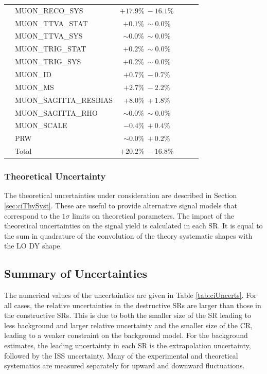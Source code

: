 {\begin{table}[]
\begin{center}
\begin{tabular}{c l c c c c}
& MUON\_RECO\_SYS & $+ 17.9\% \   -16.1\%$ \\
& MUON\_TTVA\_STAT & $+ 0.1\% \ \sim 0.0\%$ \\
& MUON\_TTVA\_SYS & $\sim 0.0\% \ \sim 0.0\%$ \\
& MUON\_TRIG\_STAT & $+ 0.2\% \ \sim 0.0\%$ \\
& MUON\_TRIG\_SYS & $+ 0.2\% \ \sim 0.0\%$ \\
& MUON\_ID & $+ 0.7\% \   -0.7\%$ \\
& MUON\_MS & $+ 2.7\% \   -2.2\%$ \\
& MUON\_SAGITTA\_RESBIAS & $+ 8.0\% \ + 1.8\%$ \\
& MUON\_SAGITTA\_RHO & $\sim 0.0\% \ \sim 0.0\%$ \\
& MUON\_SCALE & $  -0.4\% \ + 0.4\%$ \\
& PRW & $\sim 0.0\% \ + 0.2\%$ \\
& Total & $+ 20.2\% \   -16.8\%$ \\
\bottomrule
\end{tabular}
\label{tab:ciExpVariationBonanzaMm}
\end{center}
\end{table}
\clearpage
}

\subsubsection{Theoretical Uncertainty}\label{sec:ciSigThySyst}
The theoretical uncertainties under consideration are described in Section \ref{sec:ciThySyst}.
These are useful to provide alternative signal models that correspond to the $1\sigma$ limits on theoretical parameters.
The impact of the theoretical uncertainties on the signal yield is calculated in each SR.
It is equal to the sum in quadrature of the convolution of the theory systematic shapes with the LO DY shape.


\subsection{Summary of Uncertainties}

The numerical values of the uncertainties are given in Table \ref{tab:ciUncerts}.
For all cases, the relative uncertainties in the destructive SRs are larger than those in the constructive SRs.
This is due to both the smaller size of the SR leading to less background and larger relative uncertainty and the smaller size of the CR, leading to a weaker constraint on the background model.
For the background estimates, the leading uncertainty in each SR is the extrapolation uncertainty, followed by the ISS uncertainty.
Many of the experimental and theoretical systematics are measured separately for upward and downward fluctuations.


